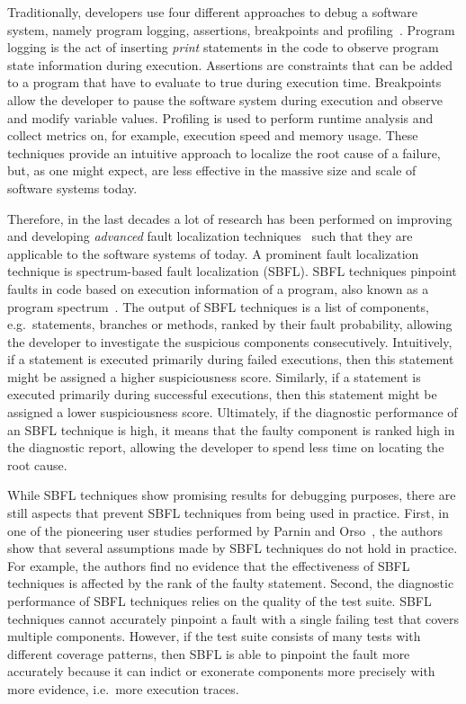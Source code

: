 \documentclass[twoside,a4paper,11pt]{memoir}
\begin{document}
Traditionally, developers use four different approaches to debug a software system, namely program logging, assertions, breakpoints and profiling~\cite{wong2016survey}.
Program logging is the act of inserting \emph{print} statements in the code to observe program state information during execution.
Assertions are constraints that can be added to a program that have to evaluate to true during execution time.
Breakpoints allow the developer to pause the software system during execution and observe and modify variable values.
Profiling is used to perform runtime analysis and collect metrics on, for example, execution speed and memory usage.
These techniques provide an intuitive approach to localize the root cause of a failure, but, as one might expect, are less effective in the massive size and scale of software systems today.

Therefore, in the last decades a lot of research has been performed on improving and developing \emph{advanced} fault localization techniques~\cite{wong2016survey} such that they are applicable to the software systems of today.
A prominent fault localization technique is spectrum-based fault localization (SBFL).
SBFL techniques pinpoint faults in code based on execution information of a program, also known as a program spectrum~\cite{reps1997use}.
The output of SBFL techniques is a list of components, e.g.\ statements, branches or methods, ranked by their fault probability, allowing the developer to investigate the suspicious components consecutively.
Intuitively, if a statement is executed primarily during failed executions, then this statement might be assigned a higher suspiciousness score.
Similarly, if a statement is executed primarily during successful executions, then this statement might be assigned a lower suspiciousness score.
Ultimately, if the diagnostic performance of an SBFL technique is high, it means that the faulty component is ranked high in the diagnostic report, allowing the developer to spend less time on locating the root cause.

While SBFL techniques show promising results for debugging purposes, there are still aspects that prevent SBFL techniques from being used in practice.
First, in one of the pioneering user studies performed by Parnin and Orso~\cite{Parnin:2011:ADT:2001420.2001445}, the authors show that several assumptions made by SBFL techniques do not hold in practice.
For example, the authors find no evidence that the effectiveness of SBFL techniques is affected by the rank of the faulty statement.
Second, the diagnostic performance of SBFL techniques relies on the quality of the test suite.
SBFL techniques cannot accurately pinpoint a fault with a single failing test that covers multiple components.
However, if the test suite consists of many tests with different coverage patterns, then SBFL is able to pinpoint the fault more accurately because it can indict or exonerate components more precisely with more evidence, i.e.\ more execution traces.
\end{document}
